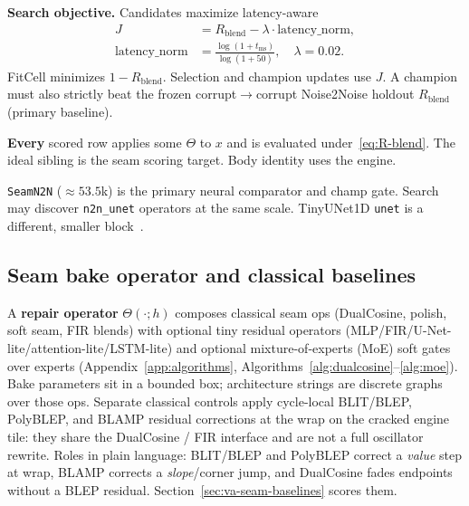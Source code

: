 \textbf{Search objective.}
Candidates maximize latency-aware
\begin{equation}
\label{eq:outer-obj}
\begin{aligned}
J&=R_{\mathrm{blend}}-\lambda\cdot\mathrm{latency\_norm},\\
\mathrm{latency\_norm}
&=\frac{\log(1+t_{\mathrm{ms}})}{\log(1+50)},
\quad \lambda=0.02.
\end{aligned}
\end{equation}
FitCell minimizes $1-R_{\mathrm{blend}}$. Selection and champion updates use $J$.
A champion must also strictly beat the frozen corrupt$\to$corrupt Noise2Noise holdout $R_{\mathrm{blend}}$ (primary baseline).

\textbf{Every} scored row applies some $\Theta$ to $x$ and is evaluated under~\eqref{eq:R-blend}.
The ideal sibling is the seam scoring target. Body identity uses the engine.

\begin{remark}
\label{rem:n2n}
\texttt{SeamN2N} (${\approx}53.5$k) is the primary neural comparator and champ gate.
Search may discover \texttt{n2n\_unet} operators at the same scale. TinyUNet1D \texttt{unet} is a different, smaller block~\cite{lehtinen2018,kashyap2021n2n}.
\end{remark}

\subsection{Seam bake operator and classical baselines}
\label{sec:bake}

A \textbf{repair operator} $\Theta(\cdot;h)$ composes classical seam ops (DualCosine, polish, soft seam, FIR blends) with optional tiny residual operators (MLP/FIR/U-Net-lite/attention-lite/LSTM-lite) and optional mixture-of-experts (MoE) soft gates over experts (Appendix~\ref{app:algorithms}, Algorithms~\ref{alg:dualcosine}--\ref{alg:moe}).
Bake parameters sit in a bounded box; architecture strings are discrete graphs over those ops.
Separate classical controls apply cycle-local BLIT/BLEP, PolyBLEP, and BLAMP residual corrections at the wrap on the cracked engine tile: they share the DualCosine / FIR interface and are not a full oscillator rewrite.
Roles in plain language: BLIT/BLEP and PolyBLEP correct a \emph{value} step at wrap, BLAMP corrects a \emph{slope}/corner jump, and DualCosine fades endpoints without a BLEP residual.
Section~\ref{sec:va-seam-baselines} scores them.

